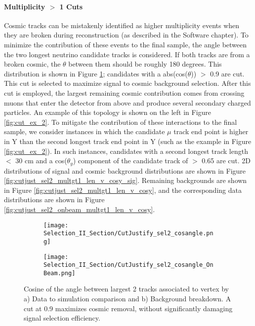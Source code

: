 \paragraph{Multiplicity $>$ 1 Cuts}
Cosmic tracks can be mistakenly identified as higher multiplicity events when they are broken during reconstruction (as described in the Software chapter). To minimize the contribution of these events to the final sample, the angle between the two longest neutrino candidate tracks is considered. If both tracks are from a broken cosmic, the $\theta$ between them should be roughly 180 degrees.  This distribution is shown in Figure \ref{fig:cutjust_sel2_cosangle}; candidates with a abs(cos($\theta$)) $>$ 0.9 are cut. This cut is selected to maximize signal to cosmic background selection. After this cut is employed, the largest remaining cosmic contribution comes from crossing muons that enter the detector from above and produce several secondary charged particles. An example of this topology is shown on the left in Figure \ref{fig:cut_ex_2}.  To mitigate the contribution of these interactions to the final sample, we consider instances in which the candidate $\mu$ track end point is higher in Y than the second longest track end point in Y (such as the example in Figure \ref{fig:cut_ex_2}).  In such instances, candidates with a second longest track length $<$ 30 cm and a cos($\theta_y$) component of the candidate track of $>$ 0.65 are cut.  2D distributions of signal and cosmic background distributions are shown in Figure \ref{fig:cutjust_sel2_multgt1_len_v_cosy_sig}. Remaining backgrounds are shown in Figure \ref{fig:cutjust_sel2_multgt1_len_v_cosy}, and the corresponding data distributions are shown in Figure \ref{fig:cutjust_sel2_onbeam_multgt1_len_v_cosy}. 

\begin{figure}[H]
  \begin{subfigure}[t]{0.37\textwidth}
\texttt{[image: Selection\_II\_Section/CutJustify\_sel2\_cosangle.png]}
  \caption{ }
  \end{subfigure} 
  \hspace{25mm}
  \begin{subfigure}[t]{0.37\textwidth}
\texttt{[image: Selection\_II\_Section/CutJustify\_sel2\_cosangle\_OnBeam.png]}
  \caption{ }
  \end{subfigure} 
\caption{Cosine of the angle between largest 2 tracks associated to vertex by a) Data to simulation comparison and b) Background breakdown. A cut at 0.9 maximizes cosmic removal, without significantly damaging signal selection efficiency. }
\label{fig:cutjust_sel2_cosangle}
\end{figure}


